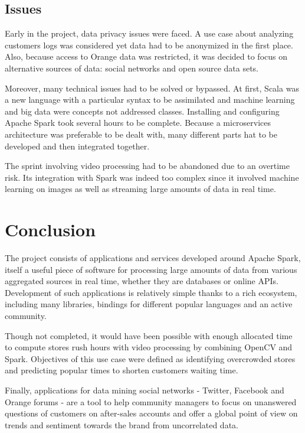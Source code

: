 \documentclass[11pt]{article}
\begin{document}
\subsection{Issues}

Early in the project, data privacy issues were faced. A use case about analyzing customers logs was considered yet data had to be anonymized in the first place. Also, because access to \textsf{Orange} data was restricted, it was decided to focus on alternative sources of data: social networks and open source data sets.

Moreover, many technical issues had to be solved or bypassed. At first, \textsf{Scala} was a new language with a particular syntax to be assimilated and machine learning and big data were concepts not addressed classes. Installing and configuring \textsf{Apache Spark} took several hours to be complete. Because a microservices architecture was preferable to be dealt with, many different parts hat to be developed and then integrated together.

The sprint involving video processing had to be abandoned due to an overtime risk. Its integration with \textsf{Spark} was indeed too complex since it involved machine learning on images as well as streaming large amounts of data in real time.

\section{Conclusion}

The project consists of applications and services developed around \textsf{Apache Spark}, itself a useful piece of software for processing large amounts of data from various aggregated sources in real time, whether they are databases or online APIs. Development of such applications is relatively simple thanks to a rich ecosystem, including many libraries, bindings for different popular languages and an active community.
\vspace{4pt}

Though not completed, it would have been possible with enough allocated time to compute stores rush hours with video processing by combining \textsf{OpenCV} and \textsf{Spark}. Objectives of this use case were defined as identifying overcrowded stores and predicting popular times to shorten customers waiting time.
\vspace{4pt}

Finally, applications for data mining social networks - \textsf{Twitter}, \textsf{Facebook} and \textsf{Orange} forums - are a tool to help community managers to focus on unanswered questions of customers on after-sales accounts and offer a global point of view on trends and sentiment towards the brand from uncorrelated data.
\vspace{4pt}
\end{document}

